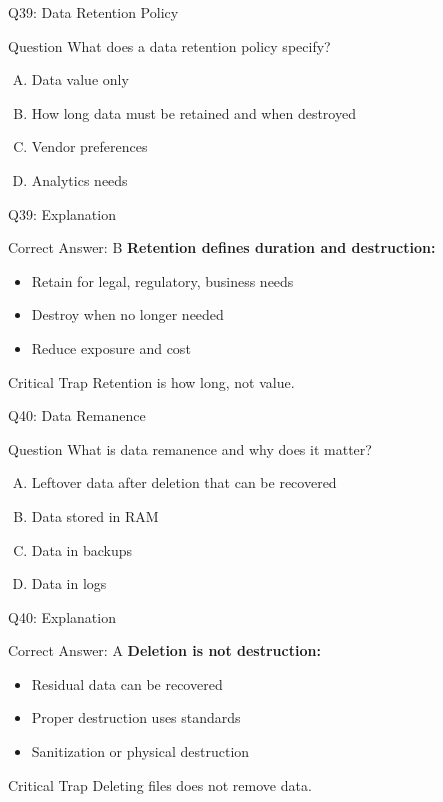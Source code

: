 \documentclass{beamer}
\begin{document}
	\begin{frame}{Q39: Data Retention Policy}
		\begin{block}{Question}
			What does a data retention policy specify?
		\end{block}
		\begin{enumerate}[(A)]
			\item Data value only
			\item How long data must be retained and when destroyed
			\item Vendor preferences
			\item Analytics needs
		\end{enumerate}
	\end{frame}
	
	\begin{frame}{Q39: Explanation}
		\begin{block}{Correct Answer: B}
			\textbf{Retention defines duration and destruction:}
			\begin{itemize}
				\item Retain for legal, regulatory, business needs
				\item Destroy when no longer needed
				\item Reduce exposure and cost
			\end{itemize}
		\end{block}
		\begin{alertblock}{Critical Trap}
			Retention is how long, not value.
		\end{alertblock}
	\end{frame}
	
	\begin{frame}{Q40: Data Remanence}
		\begin{block}{Question}
			What is data remanence and why does it matter?
		\end{block}
		\begin{enumerate}[(A)]
			\item Leftover data after deletion that can be recovered
			\item Data stored in RAM
			\item Data in backups
			\item Data in logs
		\end{enumerate}
	\end{frame}
	
	\begin{frame}{Q40: Explanation}
		\begin{block}{Correct Answer: A}
			\textbf{Deletion is not destruction:}
			\begin{itemize}
				\item Residual data can be recovered
				\item Proper destruction uses standards
				\item Sanitization or physical destruction
			\end{itemize}
		\end{block}
		\begin{alertblock}{Critical Trap}
			Deleting files does not remove data.
		\end{alertblock}
	\end{frame}
	
\end{document}
